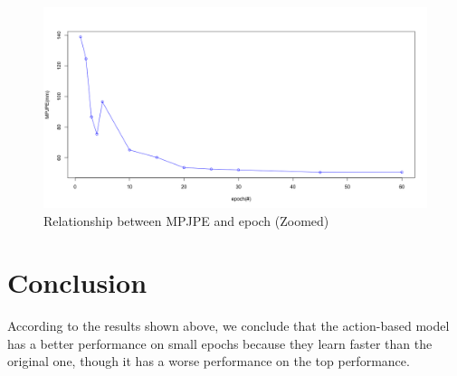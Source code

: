 \documentclass[10pt,twocolumn,letterpaper]{article}
\begin{document}
\begin{figure}[H]
	\begin{center}
  		\includegraphics[width=0.9\linewidth]{MPJPE_epoch_zoomed.png}
	\end{center}
   	\caption{Relationship between MPJPE and epoch (Zoomed)}
	\label{fig:long}
	\label{fig:onecol}
\end{figure}

\section{Conclusion}
According to the results shown above, we conclude that the action-based model has a better performance on small epochs because 
they learn faster than the original one, though it has a worse performance on the top performance.


\newpage

{\small


}
\end{document}
